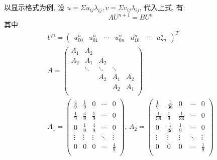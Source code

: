 \documentclass[UTF8]{article}
\begin{document}
    以显示格式为例, 设 $u = \Sigma u_{ij}\lambda_{ij}, v = \Sigma v_{ij}\lambda_{ij}$, 代入上式, 有:
    \[
        AU^{n+1} = BU^n
    \]
    其中
    \begin{gather*}
        U^n = \begin{pmatrix}
                  u_{00}^n & u_{01}^n & \cdots & u_{0n}^n & u_{10}^n & \cdots & u_{nn}^n
        \end{pmatrix}^T\\
        A =
        \begin{pmatrix}
            A_1 & A_2    &        &        &     \\
            A_2 & A_1    & A_2    &        &     \\
            & \ddots & \ddots & \ddots &     \\
            &        & A_2    & A_1    & A_2 \\
            &        &        & A_2    & A_1 \\
        \end{pmatrix}\\
        A_1 =
        \begin{pmatrix}
            \frac{4}{9} & \frac{1}{9} & 0           & \cdots & 0           \\
            \frac{1}{9} & \frac{4}{9} & \frac{1}{9} & \cdots & 0           \\
            0           & \frac{1}{9} & \frac{4}{9} & \cdots & 0           \\
            \vdots      & \vdots      & \vdots      & \ddots & \vdots      \\
            0           & 0           & 0           & \cdots & \frac{4}{9} \\
        \end{pmatrix},\,
        A_2 =
        \begin{pmatrix}
            \frac{1}{9}  & \frac{1}{36} & 0            & \cdots & 0           \\
            \frac{1}{36} & \frac{1}{9}  & \frac{1}{36} & \cdots & 0           \\
            0            & \frac{1}{36} & \frac{1}{9}  & \cdots & 0           \\
            \vdots       & \vdots       & \vdots       & \ddots & \vdots      \\
            0            & 0            & 0            & \cdots & \frac{1}{9} \\
        \end{pmatrix}\\

\end{gather*}
\end{document}
